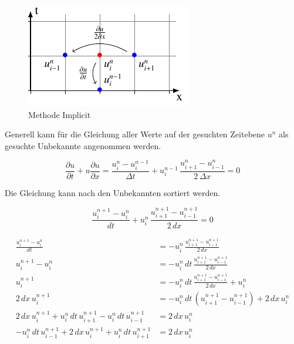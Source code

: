     \begin{figure}
	\centering
	\includegraphics[height=.4\textwidth]{papers/burgers/BurgersEquation/tikz/implicit/implicit.pdf}
	\caption{Methode Implicit}
	\label{burgers:fig:Implicit}
\end{figure}

Generell kann f\"ur die Gleichung aller Werte auf der gesuchten Zeitebene $u^n$ als gesuchte Unbekannte angenommen werden.

\begin{equation}
\frac {\partial u}{\partial t}+u{\frac {\partial u}{\partial x}} = \frac{u_{i}^{n}-u_{i}^{n-1}}{\Delta t}+ u_{i}^{n-1}\, \frac{u_{i+1}^{n}-u_{i-1}^{n}}{2\,\Delta x}=0
\end{equation}

Die Gleichung kann nach den Unbekannten sortiert werden.

\begin{equation}
    \frac{u_{i}^{n+1}-u_{i}^{n}}{dt} + u_{i}^{n} \, \frac{u_{i+1}^{n+1} - u_{i-1}^{n+1}}{2 \, dx} = 0
\end{equation}

\begin{subequations}
  \begin{align}
  \frac{u_{i}^{n+1}-u_{i}^{n}}{dt} &= -u_{i}^{n} \, \frac{u_{i+1}^{n+1} - u_{i-1}^{n+1}}{2 \, dx} \\
    u_{i}^{n+1}-u_{i}^{n} &= -u_{i}^{n} \, dt \, \frac{u_{i+1}^{n+1} - u_{i-1}^{n+1}}{2 \, dx}\\
    u_{i}^{n+1} &= -u_{i}^{n} \, dt \, \frac{u_{i+1}^{n+1} - u_{i-1}^{n+1}}{2 \, dx} + u_{i}^{n}\\
    2 \, dx \,  u_{i}^{n+1} &= -u_{i}^{n} \, dt \, \left(u_{i+1}^{n+1} - u_{i-1}^{n+1} \right) + 2 \, dx \, u_{i}^{n}\\
    2 \, dx \,  u_{i}^{n+1} + u_{i}^{n} \, dt \, u_{i+1}^{n+1} -u_{i}^{n} \, dt \, u_{i-1}^{n+1} & =  2 \, dx \, u_{i}^{n}\\
   -u_{i}^{n} \, dt \, u_{i-1}^{n+1} +  2 \, dx \,  u_{i}^{n+1} + u_{i}^{n} \, dt \, u_{i+1}^{n+1} &=  2 \, dx \, u_{i}^{n}
  \end{align}
\end{subequations}


